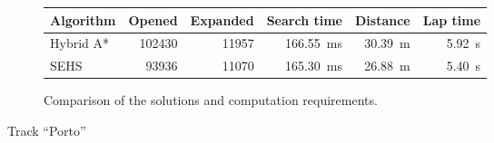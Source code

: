 \begin{figure}[!tbp]
	\begin{subfigure}[t]{\textwidth}
		\centering
		\begin{tabular}{l r r r r r}%
			\toprule
			Algorithm & Opened & Expanded & Search time & Distance & Lap time \\
			\midrule
			Hybrid A* & \num{102430} & \num{11957} & \SI{166.55}{\milli\second} & \SI{30.39}{\meter} & \SI{5.92}{\second} \\
			SEHS & \bftab \num{93936} & \bftab \num{11070} & \bftab \SI{165.30}{\milli\second} & \bftab \SI{26.88}{\meter} & \bftab \SI{5.40}{\second} \\
			\bottomrule
		\end{tabular}
		\caption{Comparison of the solutions and computation requirements.}
		\label{table:porto}
	\end{subfigure}

	\vspace{0.75cm}
	
	\caption{Track ``Porto''}
	\label{fig:porto}
\end{figure}



